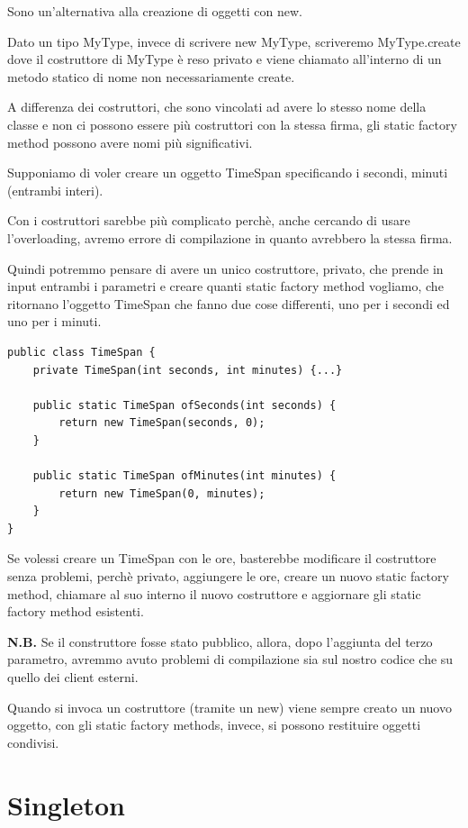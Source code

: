 Sono un'alternativa alla creazione di oggetti con new.

Dato un tipo MyType, invece di scrivere new MyType, scriveremo MyType.create dove il costruttore di MyType è reso privato e viene chiamato all'interno di un metodo 
statico di nome non necessariamente create.

A differenza dei costruttori, che sono vincolati ad avere lo stesso nome della classe e non ci possono essere più costruttori con la stessa firma, gli static factory 
method possono avere nomi più significativi.

Supponiamo di voler creare un oggetto TimeSpan specificando i secondi, minuti (entrambi interi).

Con i costruttori sarebbe più complicato perchè, anche cercando di usare l'overloading, avremo errore di compilazione in quanto avrebbero la stessa firma.

Quindi potremmo pensare di avere un unico costruttore, privato, che prende in input entrambi i parametri e creare quanti static factory method vogliamo, che ritornano
l'oggetto TimeSpan che fanno due cose differenti, uno per i secondi ed uno per i minuti.

\begin{lstlisting}
public class TimeSpan {
    private TimeSpan(int seconds, int minutes) {...}

    public static TimeSpan ofSeconds(int seconds) {
        return new TimeSpan(seconds, 0);
    }

    public static TimeSpan ofMinutes(int minutes) {
        return new TimeSpan(0, minutes);
    }
}
\end{lstlisting}

Se volessi creare un TimeSpan con le ore, basterebbe modificare il costruttore senza problemi, perchè privato, aggiungere le ore, creare un nuovo static factory method, 
chiamare al suo interno il nuovo costruttore e aggiornare gli static factory method esistenti.

\medskip
\textbf{N.B.} Se il construttore fosse stato pubblico, allora, dopo l'aggiunta del terzo parametro, avremmo avuto problemi di compilazione sia sul nostro codice che su 
quello dei client esterni.
\medskip

Quando si invoca un costruttore (tramite un new) viene sempre creato un nuovo oggetto, con gli static factory methods, invece, si possono restituire oggetti condivisi.

\section{Singleton}

